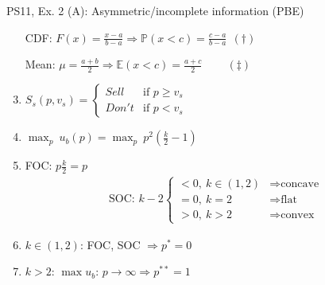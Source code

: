 \begin{frame}{PS11, Ex. 2 (A): Asymmetric/incomplete information (PBE)}
\begin{multicols}{2}
\begin{enumerate}
        \item[CDF:] \vspace{-2pt} $F(x)=\frac{x-a}{b-a}\Rightarrow\mathbb{P}(x<c)=\frac{c-a}{b-a}\ \ (\dagger)$
        \item[Mean:] \vspace{-2pt}  $\mu=\frac{a+b}{2}\Rightarrow\mathbb{E}(x<c)=\frac{a+c}{2}\quad\quad\ (\ddagger)$
        \item \vspace{-2pt} $S_s(p,v_s)=\left\{\begin{array}{ll}
          Sell  & \text{if }p\geq v_s \\
          Don't & \text{if }p < v_s
        \end{array}\right.$
        \item \vspace{-2pt} $\displaystyle{\max_p}\ u_b(p)=\displaystyle{\max_p}\ p^2\left(\frac{k}{2}-1\right)$
        \item \vspace{-2pt} FOC: $p\frac{k}{2}=p$\vspace{-6pt}
        \begin{align*}
          \text{SOC: }k-2\left\{\begin{array}{ll}
              <0,\ k\in(1,2)&\Rightarrow\text{concave}\\
              =0,\ k=2&\Rightarrow\text{flat}\\
              >0,\ k>2&\Rightarrow\text{convex}
          \end{array}\right.
        \end{align*}
        \item \vspace{-6pt} $k\in(1,2)$: FOC, SOC $\Rightarrow p^*=0$
        \item \vspace{-2pt} $k>2$: $\max u_b$: $p\rightarrow\infty\Rightarrow p^{**}=1$
      \end{enumerate}
      \vfill\null
    \end{multicols}
\end{frame}
